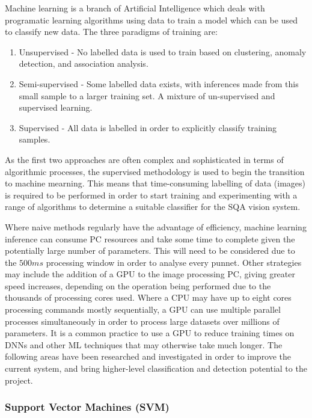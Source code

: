 \documentclass[fleqn,twoside]{article}
\begin{document}
Machine learning is a branch of Artificial Intelligence which deals with programatic learning algorithms using data to train a model which can be used to classify new data. The three paradigms of training are:

\begin{enumerate}
	\item Unsupervised - No labelled data is used to train based on clustering, anomaly detection, and association analysis.
	\item Semi-supervised - Some labelled data exists, with inferences made from this small sample to a larger training set. A mixture of un-supervised and supervised learning.
	\item Supervised - All data is labelled in order to explicitly classify training samples.
\end{enumerate} 

As the first two approaches are often complex and sophisticated in terms of algorithmic processes, the supervised methodology is used to begin the transition to machine mearning. This means that time-consuming labelling of data (images) is required to be performed in order to start training and experimenting with a range of algorithms to determine a suitable classifier for the SQA vision system.

Where naive methods regularly have the advantage of efficiency, machine learning inference can consume PC resources and take some time to complete given the potentially large number of parameters. This will need to be considered due to the $500ms$ processing window in order to analyse every punnet. Other strategies may include the addition of a GPU to the image processing PC, giving greater speed increases, depending on the operation being performed due to the thousands of processing cores used. Where a CPU may have up to eight cores processing commands mostly sequentially, a GPU can use  multiple parallel processes simultaneously in order to process large datasets over millions of parameters. It is a common practice to use a GPU to reduce training times on DNNs and other ML techniques that may otherwise take much longer. The following areas have been researched and investigated in order to improve the current system, and bring higher-level classification and detection potential to the project.


\subsubsection{Support Vector Machines (SVM)}
\end{document}
